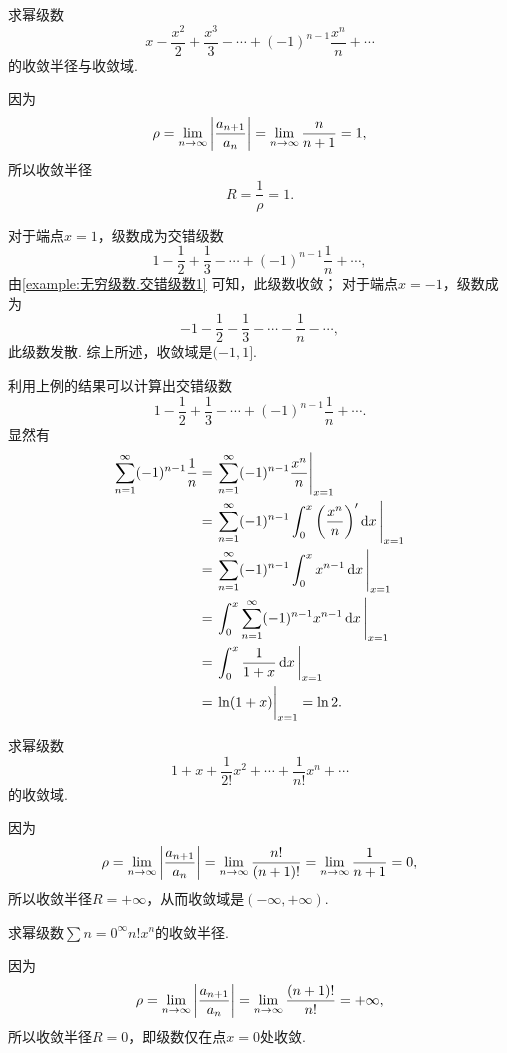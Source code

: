 \begin{example}
求幂级数\[
x-\frac{x^2}{2}+\frac{x^3}{3}-\dotsb+(-1)^{n-1}\frac{x^n}{n}+\dotsb
\]的收敛半径与收敛域.
\begin{solution}
因为\[
\rho = \lim\limits_{n\to\infty} \abs{\frac{a_{n+1}}{a_n}}
= \lim\limits_{n\to\infty} \frac{n}{n+1} = 1,
\]所以收敛半径\[
R = \frac{1}{\rho} = 1.
\]

对于端点\(x=1\)，级数成为交错级数\[
1-\frac{1}{2}+\frac{1}{3}-\dotsb+(-1)^{n-1}\frac{1}{n}+\dotsb,
\]由\cref{example:无穷级数.交错级数1} 可知，此级数收敛；
对于端点\(x=-1\)，级数成为\[
-1-\frac{1}{2}-\frac{1}{3}-\dotsb-\frac{1}{n}-\dotsb,
\]此级数发散.
综上所述，收敛域是\((-1,1]\).
\end{solution}
\end{example}
利用上例的结果可以计算出交错级数\[
1-\frac{1}{2}+\frac{1}{3}-\dotsb+(-1)^{n-1}\frac{1}{n}+\dotsb.
\]显然有
\begin{align*}
\sum\limits_{n=1}^{\infty} (-1)^{n-1} \frac{1}{n}
&= \eval{\sum\limits_{n=1}^{\infty} (-1)^{n-1} \frac{x^n}{n}}_{x=1} \\
&= \eval{\sum\limits_{n=1}^{\infty} (-1)^{n-1} \int_0^x \left(\frac{x^n}{n}\right)' \dd{x}}_{x=1} \\
&= \eval{\sum\limits_{n=1}^{\infty} (-1)^{n-1} \int_0^x x^{n-1} \dd{x}}_{x=1} \\
&= \eval{\int_0^x \sum\limits_{n=1}^{\infty} (-1)^{n-1} x^{n-1} \dd{x}}_{x=1} \\
&= \eval{\int_0^x \frac{1}{1+x} \dd{x}}_{x=1} \\
&= \eval{\ln(1+x)}_{x=1} = \ln2.
\end{align*}

\begin{example}
求幂级数\[
1+x+\frac{1}{2!}x^2+\dotsb+\frac{1}{n!}x^n+\dotsb
\]的收敛域.
\begin{solution}
因为\[
\rho = \lim\limits_{n\to\infty} \abs{\frac{a_{n+1}}{a_n}}
= \lim\limits_{n\to\infty} \frac{n!}{(n+1)!}
= \lim\limits_{n\to\infty} \frac{1}{n+1}
= 0,
\]所以收敛半径\(R = +\infty\)，从而收敛域是\((-\infty,+\infty)\).
\end{solution}
\end{example}

\begin{example}
求幂级数\(\sum\limits{n=0}^{\infty} n! x^n\)的收敛半径.
\begin{solution}
因为\[
\rho = \lim\limits_{n\to\infty} \abs{\frac{a_{n+1}}{a_n}}
= \lim\limits_{n\to\infty} \frac{(n+1)!}{n!} = +\infty,
\]所以收敛半径\(R = 0\)，即级数仅在点\(x = 0\)处收敛.
\end{solution}
\end{example}

